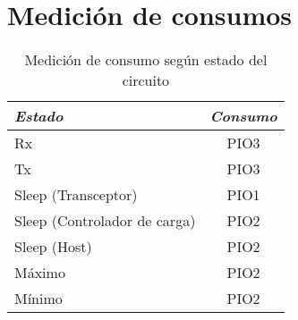 

\section{Medición de consumos}
\label{sec:Medición}

\begin{table}[ht]
	\centering
	\caption{Medición de consumo según estado del circuito}
	\begin{tabular}{@{} l *1c @{}}    \toprule
		\emph{\textbf{Estado}} & \emph{\textbf{Consumo}}\\
		\midrule
		Rx &  PIO3\\	
		Tx	&  PIO3\\
		Sleep (Transceptor) &  PIO1\\
		Sleep (Controlador de carga) &  PIO2\\
		Sleep (Host) &  PIO2\\
		Máximo &  PIO2\\
		Mínimo &  PIO2\\
		\bottomrule
		\hline
	\end{tabular}
	\label{tab:bq}
\end{table}







